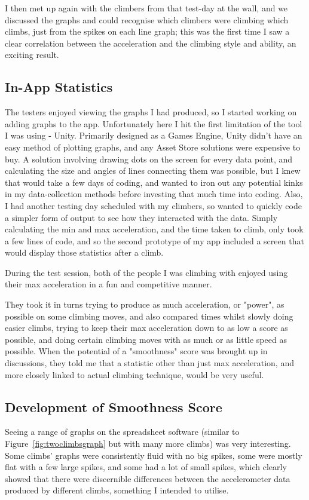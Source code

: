 I then met up again with the climbers from that test-day at the wall, and we discussed the graphs and could recognise which climbers were climbing which climbs, just from the spikes on each line graph; this was the first time I saw a clear correlation between the acceleration and the climbing style and ability, an exciting result.

\subsection{In-App Statistics}
The testers enjoyed viewing the graphs I had produced, so I started working on adding graphs to the app.
Unfortunately here I hit the first limitation of the tool I was using - Unity.
Primarily designed as a Games Engine, Unity didn't have an easy method of plotting graphs, and any Asset Store solutions were expensive to buy. 
A solution involving drawing dots on the screen for every data point, and calculating the size and angles of lines connecting them was possible, but I knew that would take a few days of coding, and wanted to iron out any potential kinks in my data-collection methods before investing that much time into coding.
Also, I had another testing day scheduled with my climbers, so wanted to quickly code a simpler form of output to see how they interacted with the data.
Simply calculating the min and max acceleration, and the time taken to climb, only took a few lines of code, and so the second prototype of my app included a screen that would display those statistics after a climb.

During the test session, both of the people I was climbing with enjoyed using their max acceleration in a fun and competitive manner.

They took it in turns trying to produce as much acceleration, or "power", as possible on some climbing moves, and also compared times whilst slowly doing easier climbs, trying to keep their max acceleration down to as low a score as possible, and doing certain climbing moves with as much or as little speed as possible.
When the potential of a "smoothness" score was brought up in discussions, they told me that a statistic other than just max acceleration, and more closely linked to actual climbing technique, would be very useful.

\subsection{Development of Smoothness Score}
Seeing a range of graphs on the spreadsheet software (similar to Figure~\ref{fig:twoclimbsgraph} but with many more climbs) was very interesting.
Some climbs' graphs were consistently fluid with no big spikes, some were mostly flat with a few large spikes, and some had a lot of small spikes, which clearly showed that there were discernible differences between the accelerometer data produced by different climbs, something I intended to utilise.

